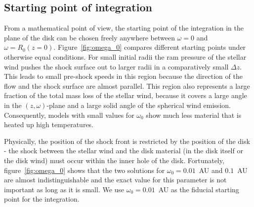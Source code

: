 \subsection{Starting point of integration}
From a mathematical point of view, the starting point of the integration in the plane of the disk can be chosen freely anywhere between $\omega=0$ and $\omega=R_0(z=0)$. Figure~\ref{fig:omega_0} compares different starting points under otherwise equal conditions. For small initial radii the ram pressure of the stellar wind pushes the shock surface out to larger radii in a comparatively small $\Delta z$. This leads to small pre-shock speeds in this region because the direction of the flow and the shock surface are almost parallel. This region also represents a large fraction of the total mass loss of the stellar wind, because it covers a large angle in the $(z,\omega)$-plane and a large solid angle of the spherical wind emission. Consequently, models with small values for $\omega_0$ show much less material that is heated up high temperatures. 

Physically, the position of the shock front is restricted by the position of the disk - the shock between the stellar wind and the disk material (in the disk itself or the disk wind) must occur within the inner hole of the disk. Fortunately, figure~\ref{fig:omega_0} shows that the two solutions for $\omega_0=0.01$~AU and $0.1$~AU are almost indistinguishable and the exact value for this parameter is not important as long as it is small. We use $\omega_0 = 0.01$~AU as the fiducial starting point for the integration.